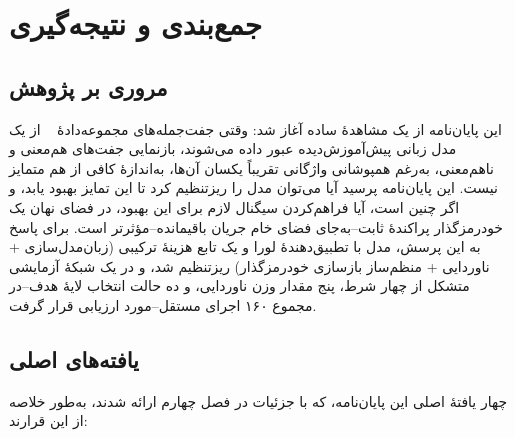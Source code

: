 
\chapter{جمع‌بندی و نتیجه‌گیری}
\label{ch:conclusion}

\section{مروری بر پژوهش}
این پایان‌نامه از یک مشاهدهٔ ساده آغاز شد: وقتی جفت‌جمله‌های مجموعه‌دادهٔ
~\cite{zhang2019paws}
از یک مدل زبانی پیش‌آموزش‌دیده عبور داده می‌شوند، بازنمایی جفت‌های هم‌معنی و ناهم‌معنی، به‌رغم همپوشانی واژگانی تقریباً یکسان آن‌ها، به‌اندازهٔ کافی از هم متمایز نیست. این پایان‌نامه پرسید آیا می‌توان مدل را ریزتنظیم کرد تا این تمایز بهبود یابد، و اگر چنین است، آیا فراهم‌کردن سیگنال لازم برای این بهبود، در فضای نهان یک خودرمزگذار پراکندهٔ ثابت--به‌جای فضای خام جریان باقیمانده--مؤثرتر است. برای پاسخ به این پرسش، مدل
با تطبیق‌دهندهٔ لورا و یک تابع هزینهٔ ترکیبی (زبان‌مدل‌سازی + ناوردایی + منظم‌ساز بازسازی خودرمزگذار) ریزتنظیم شد، و در یک شبکهٔ آزمایشی متشکل از چهار شرط، پنج مقدار وزن ناوردایی، و ده حالت انتخاب لایهٔ هدف--در مجموع ۱۶۰ اجرای مستقل--مورد ارزیابی قرار گرفت.

\section{یافته‌های اصلی}
چهار یافتهٔ اصلی این پایان‌نامه، که با جزئیات در فصل چهارم ارائه شدند، به‌طور خلاصه از این قرارند:

